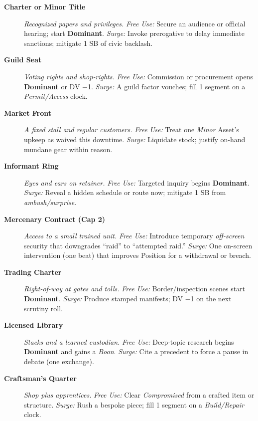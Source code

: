 \begin{description}
  \item[\textbf{Charter or Minor Title}]  \emph{Recognized papers and privileges.} \emph{Free Use:} Secure an audience or official hearing; start \textbf{Dominant}. \emph{Surge:} Invoke prerogative to delay immediate sanctions; mitigate 1 SB of civic backlash.

  \item[\textbf{Guild Seat}]  \emph{Voting rights and shop‑rights.} \emph{Free Use:} Commission or procurement opens \textbf{Dominant} or DV −1. \emph{Surge:} A guild factor vouches; fill 1 segment on a \emph{Permit/Access} clock.

  \item[\textbf{Market Front}]  \emph{A fixed stall and regular customers.} \emph{Free Use:} Treat one \emph{Minor} Asset's upkeep as waived this downtime. \emph{Surge:} Liquidate stock; justify on-hand mundane gear within reason.

  \item[\textbf{Informant Ring}]  \emph{Eyes and ears on retainer.} \emph{Free Use:} Targeted inquiry begins \textbf{Dominant}. \emph{Surge:} Reveal a hidden schedule or route now; mitigate 1 SB from \emph{ambush/surprise}.

  \item[\textbf{Mercenary Contract (Cap 2)}]  \emph{Access to a small trained unit.} \emph{Free Use:} Introduce temporary \emph{off-screen} security that downgrades “raid” to “attempted raid.” \emph{Surge:} One on-screen intervention (one beat) that improves Position for a withdrawal or breach.

  \item[\textbf{Trading Charter}]  \emph{Right-of-way at gates and tolls.} \emph{Free Use:} Border/inspection scenes start \textbf{Dominant}. \emph{Surge:} Produce stamped manifests; DV −1 on the next scrutiny roll.

  \item[\textbf{Licensed Library}]  \emph{Stacks and a learned custodian.} \emph{Free Use:} Deep‑topic research begins \textbf{Dominant} and gains a \emph{Boon}. \emph{Surge:} Cite a precedent to force a pause in debate (one exchange).

  \item[\textbf{Craftsman's Quarter}]  \emph{Shop plus apprentices.} \emph{Free Use:} Clear \emph{Compromised} from a crafted item or structure. \emph{Surge:} Rush a bespoke piece; fill 1 segment on a \emph{Build/Repair} clock.


\end{description}

